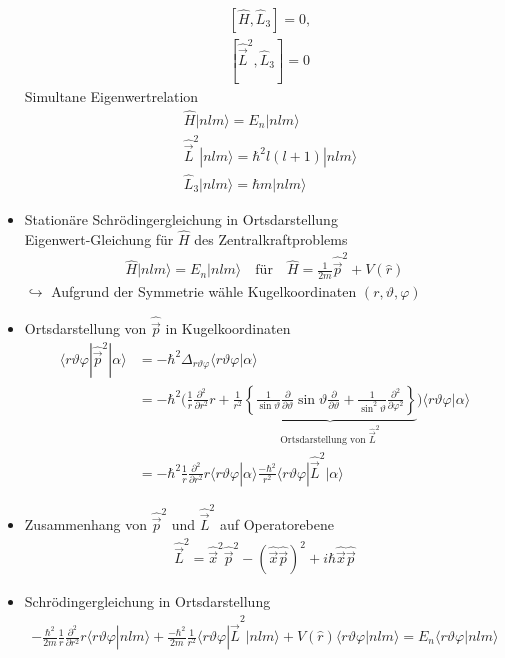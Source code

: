 \documentclass[10pt,article,colorback,accentcolor=tud9d]{scrartcl}
\begin{document}
\begin{itemize}
\begin{align}
    &[\hat{H},\hat{L}_3]=0,\\
    &[\hat{\vec{L}}^2,\hat{L}_3]=0
    \end{align}
    Simultane Eigenwertrelation
    \begin{align}
    &\hat{H}|nlm\rangle=E_n|nlm\rangle\\
    &\hat{\vec{L}}^2|nlm\rangle=\hbar^2l(l+1)|nlm\rangle\\
    &\hat{L}_3|nlm\rangle=\hbar m|nlm\rangle
    \end{align}
      \item Stationäre Schrödingergleichung in Ortsdarstellung\\
    Eigenwert-Gleichung für $\hat{H}$ des Zentralkraftproblems
    \begin{align}
    \hat{H}|nlm\rangle=E_n|nlm\rangle\quad\text{für}\quad\hat{H}=\frac{1}{2m}\hat{\vec{p}}^2+V(\hat{r})
    \end{align}
    $\hookrightarrow$ Aufgrund der Symmetrie wähle Kugelkoordinaten $(r,\vartheta,\varphi)$\\
  \item Ortsdarstellung von $\hat{\vec{p}}$ in Kugelkoordinaten
    \begin{align}
    \langle r\vartheta\varphi|\hat{\vec{p}}^2|\alpha\rangle&=-\hbar^2\Delta_{r\vartheta\varphi}\langle r\vartheta\varphi|\alpha\rangle\\
    &=-\hbar^2\bigg(\frac{1}{r}\frac{\partial^2}{\partial r^2}r+\frac{1}{r^2}\underbrace{\left\{\frac{1}{\sin\vartheta}\frac{\partial}{\partial\vartheta}\sin\vartheta\frac{\partial}{\partial\vartheta}+\frac{1}{\sin^2\vartheta}\frac{\partial^2}{\partial\varphi^2}\right\}}_\text{Ortsdarstellung von $\hat{\vec{L}}^2$}\bigg)\langle r\vartheta\varphi|\alpha\rangle\\
    &=-\hbar^2\frac{1}{r}\frac{\partial^2}{\partial r^2}r\langle r\vartheta\varphi|\alpha\rangle\frac{-\hbar^2}{r^2}\langle r\vartheta\varphi|\hat{\vec{L}}^2|\alpha\rangle
    \end{align}
  \item Zusammenhang von $\hat{\vec{p}}^2$ und $\hat{\vec{L}}^2$ auf Operatorebene
    \begin{align}
    \hat{\vec{L}}^2=\hat{\vec{x}}^2\hat{\vec{p}}^2-(\hat{\vec{x}}\hat{\vec{p}})^2+i\hbar\hat{\vec{x}}\hat{\vec{p}}
    \end{align}
  \item Schrödingergleichung in Ortsdarstellung
    \begin{align}
    -\frac{\hbar^2}{2m}\frac{1}{r}\frac{\partial^2}{\partial r^2}r\langle r\vartheta\varphi|nlm\rangle+\frac{-\hbar^2}{2m}\frac{1}{r^2}\langle r\vartheta\varphi|\hat{\vec{L}}^2|nlm\rangle+V(\hat{r})\langle r\vartheta\varphi|nlm\rangle=E_n\langle r\vartheta\varphi|nlm\rangle

\end{align}
\end{itemize}
\end{document}
